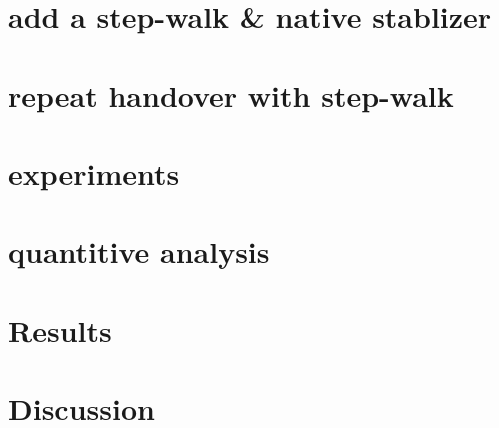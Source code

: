 \newpage
\section{add a step-walk \& native stablizer}

\newpage
\section{repeat handover with step-walk}

\newpage
\section{experiments}

\newpage
\section{quantitive analysis}

\newpage
\section{Results}

\newpage
\section{Discussion}












